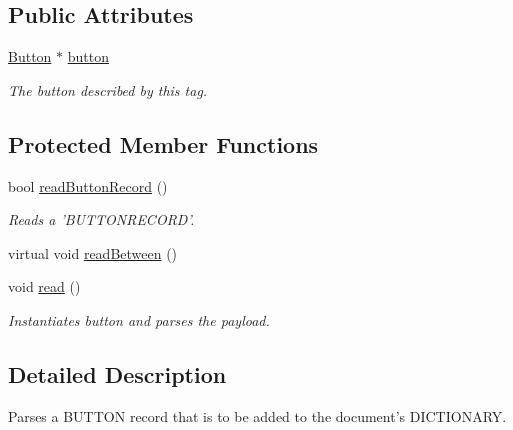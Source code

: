 \subsection*{Public Attributes}
\begin{DoxyCompactItemize}
\item 
\hypertarget{classjswf_1_1flash_1_1tags_1_1_define_button_tag_aaefc1f3509d742c22095608b15a99ab5}{\hyperlink{classjswf_1_1flash_1_1_button}{Button} $\ast$ \hyperlink{classjswf_1_1flash_1_1tags_1_1_define_button_tag_aaefc1f3509d742c22095608b15a99ab5}{button}}\label{classjswf_1_1flash_1_1tags_1_1_define_button_tag_aaefc1f3509d742c22095608b15a99ab5}

\begin{DoxyCompactList}\small\item\em The button described by this tag. \end{DoxyCompactList}\end{DoxyCompactItemize}
\subsection*{Protected Member Functions}
\begin{DoxyCompactItemize}
\item 
bool \hyperlink{classjswf_1_1flash_1_1tags_1_1_define_button_tag_a7e9e4408daecaf9baabaffcce193799f}{read\+Button\+Record} ()
\begin{DoxyCompactList}\small\item\em Reads a 'B\+U\+T\+T\+O\+N\+R\+E\+C\+O\+R\+D'. \end{DoxyCompactList}\item 
virtual void \hyperlink{classjswf_1_1flash_1_1tags_1_1_define_button_tag_ab984c03a3deccd5619922753ef43cff2}{read\+Between} ()
\item 
void \hyperlink{classjswf_1_1flash_1_1tags_1_1_define_button_tag_ae358498c775dbe0271fae6d9b5a44643}{read} ()
\begin{DoxyCompactList}\small\item\em Instantiates button and parses the payload. \end{DoxyCompactList}\end{DoxyCompactItemize}


\subsection{Detailed Description}
Parses a {\ttfamily B\+U\+T\+T\+O\+N} record that is to be added to the document's {\ttfamily D\+I\+C\+T\+I\+O\+N\+A\+R\+Y}. 

